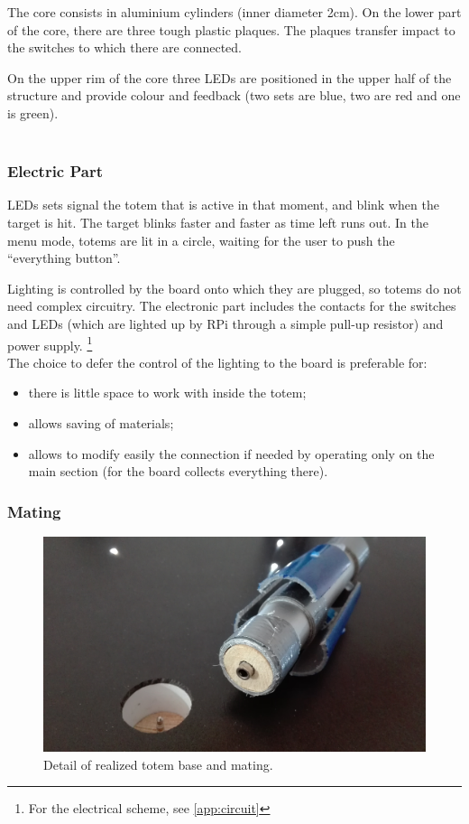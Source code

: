 \documentclass[a4paper,twoside]{book}
\begin{document}
The core consists in aluminium cylinders (inner diameter 2cm). On the lower part of the core, there are three tough plastic plaques. The plaques transfer impact to the switches to which there are connected.

On the upper rim of the core three LEDs are positioned in the upper half of the structure and provide colour and feedback (two sets are blue, two are red and one is green).
\\
\\
\subsubsection{Electric Part}
LEDs sets signal the totem that is active in that moment, and blink when the target is hit. The target blinks faster and faster as time left runs out. In the menu mode, totems are lit in a circle, waiting for the user to push the \textquotedblleft everything button\textquotedblright.

Lighting is controlled by the board onto which they are plugged, so totems do not need complex circuitry. The electronic part includes the contacts for the switches and LEDs (which are lighted up by RPi through a simple pull-up resistor) and power supply.
\footnote{For the electrical scheme, see \autoref{app:circuit}}
\\
The choice to defer the control of the lighting to the board is preferable for:
\begin{itemize}
\item there is little space to work with inside the totem;
\item allows saving of materials;
\item allows to modify easily the connection if needed by operating only on the main section (for the board collects everything there).
\end{itemize}

\subsubsection{Mating}

\begin{figure}[h]
\includegraphics[width=\linewidth]{img/IMG_20160616_114517} 
\caption{Detail of realized totem base and mating.}
\end{figure}
\end{document}
